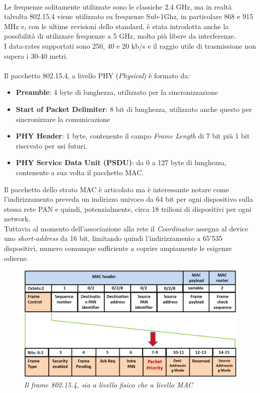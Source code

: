 \\Le frequenze solitamente utilizzate sono le classiche 2.4 GHz, ma in realtà talvolta 802.15.4 viene utilizzato su frequenze Sub-1Ghz, in particolare 868 e 915 MHz e, con le ultime revisioni dello standard, è stata introdotta anche la possibilità di utilizzare frequenze a 5 GHz, molto più libere da interferenze.
\\I data-rates supportati sono 250, 40 e 20 kb/s e il raggio utile di trasmissione non supera i 30-40 metri.
\\\\Il pacchetto 802.15.4, a livello PHY (\textit{Physical}) è formato da:
\begin{itemize}
\item \textbf{Preamble}: 4 byte di lunghezza, utilizzato per la sincronizzazione
\item \textbf{Start of Packet Delimiter}: 8 bit di lunghezza, utilizzato anche questo per sincronizzare la comunicazione
\item \textbf{PHY Header}: 1 byte, contenente il campo \textit{Frame Length} di 7 bit più 1 bit riservato per usi futuri.
\item \textbf{PHY Service Data Unit (PSDU)}: da 0 a 127 byte di lunghezza, contenente a sua volta il pacchetto MAC.
\end{itemize}
Il pacchetto dello strato MAC è articolato ma è interessante notare come l'indirizzamento preveda un indirizzo univoco da 64 bit per ogni dispositivo sulla stessa rete PAN e quindi, potenzialmente, circa 18 trilioni di dispositivi per ogni network.
\\Tuttavia al momento dell'associazione alla rete il \textit{Coordinator} assegna al device uno \textit{short-address} da 16 bit, limitando quindi l'indirizzamento a 65'535 dispositivi, numero comunque sufficiente a coprire ampiamente le esigenze odierne.
\begin{figure}[!h]
\centering
\includegraphics[scale=3.00]{immagini/802154-frame.png}
\caption{\textit{Il frame 802.15.4, sia a livello fisico che a livello MAC}}
\end{figure}
